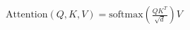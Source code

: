 \documentclass[preview]{standalone}
\begin{document}
\begin{align*}
\text{Attention}(Q, K, V) = \text{softmax}\left(\frac{QK^T}{\sqrt{d}}\right)V
\end{align*}
\end{document}
